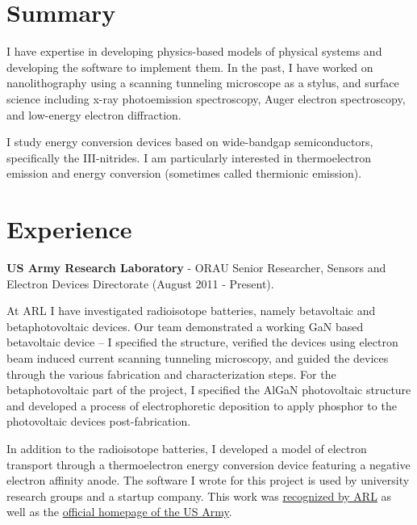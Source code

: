 

\section{Summary}

I have expertise in developing physics-based models of physical systems
and developing the software to implement them. In the past, I have
worked on nanolithography using a scanning tunneling microscope as a
stylus, and surface science including x-ray photoemission spectroscopy,
Auger electron spectroscopy, and low-energy electron diffraction.

I study energy conversion devices based on wide-bandgap semiconductors,
specifically the III-nitrides. I am particularly interested in
thermoelectron emission and energy conversion (sometimes called
thermionic emission).

\section{Experience}

\textbf{US Army Research Laboratory} - ORAU Senior Researcher, Sensors
and Electron Devices Directorate (August 2011 - Present).

At ARL I have investigated radioisotope batteries, namely betavoltaic
and betaphotovoltaic devices. Our team demonstrated a working GaN based
betavoltaic device -- I specified the structure, verified the devices
using electron beam induced current scanning tunneling microscopy, and
guided the devices through the various fabrication and characterization
steps. For the betaphotovoltaic part of the project, I specified the
AlGaN photovoltaic structure and developed a process of electrophoretic
deposition to apply phosphor to the photovoltaic devices
post-fabrication.

In addition to the radioisotope batteries, I developed a model of
electron transport through a thermoelectron energy conversion device
featuring a negative electron affinity anode. The software I wrote for
this project is used by university research groups and a startup
company. This work was
\href{http://www.arl.army.mil/www/default.cfm?article=2462}{recognized
by ARL} as well as the
\href{http://www.army.mil/article/123473/Visiting_Army_scientist_makes_discoveries_in_emerging_technology/}{official
homepage of the US Army}.

